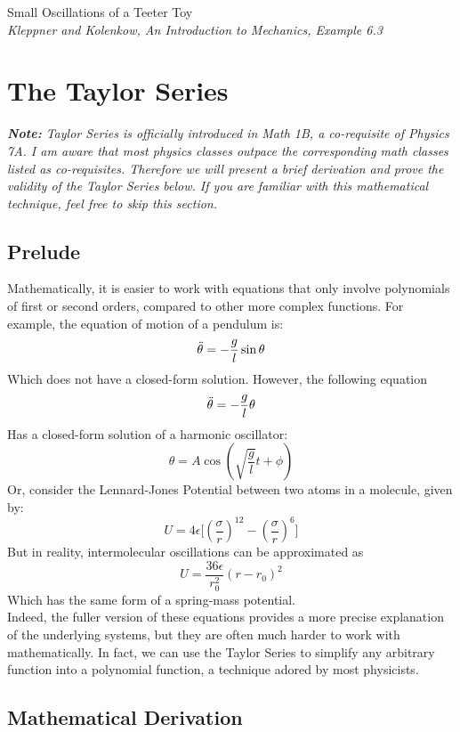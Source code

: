 \documentclass[11pt]{article}
\theoremstyle{gangnamstyle}{\newtheorem{definition}{Definition}[]}
\theoremstyle{gangnamstyle}{\newtheorem{example}{Example}[]}
\theoremstyle{gangnamstyle}{\newtheorem{problem}{Problem}[]}
\theoremstyle{gangnamstyle}{\newtheorem{warning}{Warning}[]}
\begin{document}
\begin{example}
Small Oscillations of a Teeter Toy \\
\textit{Kleppner and Kolenkow, An Introduction to Mechanics, Example 6.3} \\


\end{example}

\pagebreak

\section{The Taylor Series}

\textit{\textbf{Note:} Taylor Series is officially introduced in Math 1B, a co-requisite of Physics 7A. I am aware that most physics classes outpace the corresponding math classes listed as co-requisites. Therefore we will present a brief derivation and prove the validity of the Taylor Series below. If you are familiar with this mathematical technique, feel free to skip this section.} 

\subsection{Prelude}

Mathematically, it is easier to work with equations that only involve polynomials of first or second orders, compared to other more complex functions. For example, the equation of motion of a pendulum is: 
\[ \Ddot{\theta} = -\frac{g}{l}\sin\theta \]
Which does not have a closed-form solution. However, the following equation
\[ \Ddot{\theta} = -\frac{g}{l}\theta \]
Has a closed-form solution of a harmonic oscillator: 
\[ \theta = A\cos(\sqrt{\frac{g}{l}}t + \phi) \]
Or, consider the Lennard-Jones Potential between two atoms in a molecule, given by:
\[ U = 4\epsilon\Big[ (\frac{\sigma}{r})^{12} - (\frac{\sigma}{r})^6 \Big] \]
But in reality, intermolecular oscillations can be approximated as
\[ U = \frac{36\epsilon}{r_0^2}(r - r_0)^2 \]
Which has the same form of a spring-mass potential. \\

Indeed, the fuller version of these equations provides a more precise explanation of the underlying systems, but they are often much harder to work with mathematically. In fact, we can use the Taylor Series to simplify any arbitrary function into a polynomial function, a technique adored by most physicists. 

\subsection{Mathematical Derivation}
\end{document}
